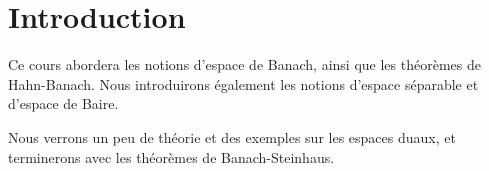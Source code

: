 \section*{Introduction}

Ce cours abordera les notions d'espace de Banach, ainsi que les théorèmes de
Hahn-Banach.
Nous introduirons également les notions d'espace séparable et d'espace de Baire.

Nous verrons un peu de théorie et des exemples sur les espaces duaux, et
terminerons avec les théorèmes de Banach-Steinhaus.

